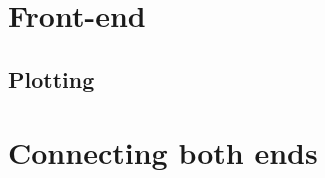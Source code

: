 \documentclass[a4paper, openany, oneside]{memoir}
\begin{document}
\section{Front-end}
\label{sec:clientside}

\subsection{Plotting}
\label{sec:plotting}

\section{Connecting both ends}
\label{sec:websockets}
\end{document}

